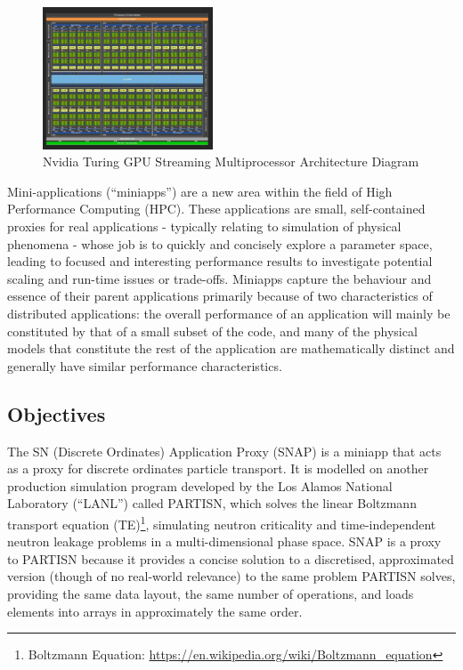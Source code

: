 \documentclass[conference]{IEEEtran}
\begin{document}
\begin{figure}
\centering
\includegraphics[width=0.45\textwidth]{images/gpu_diagram.jpg}
\caption{Nvidia Turing GPU Streaming Multiprocessor Architecture Diagram}
\label{fig:gpu_diagram}
\end{figure}

Mini-applications (``miniapps”) are a new area within the field of High Performance Computing (HPC). These applications are small, self-contained proxies for real applications - typically relating to simulation of physical phenomena - whose job is to quickly and concisely explore a parameter space, leading to focused and interesting performance results to investigate potential scaling and run-time issues or trade-offs\cite{miniapps}. Miniapps capture the behaviour and essence of their parent applications primarily because of two characteristics of distributed applications: the overall performance of an application will mainly be constituted by that of a small subset of the code, and many of the physical models that constitute the rest of the application are mathematically distinct and generally have similar performance characteristics\cite{miniapps}.

\subsection{Objectives}

The SN (Discrete Ordinates) Application Proxy (SNAP) is a miniapp that acts as a proxy for discrete ordinates particle transport. It is modelled on another production simulation program developed by the Los Alamos National Laboratory (``LANL'') called PARTISN, which solves the linear Boltzmann transport equation (TE)\footnote{Boltzmann Equation: \url{https://en.wikipedia.org/wiki/Boltzmann_equation}\raggedright}, simulating neutron criticality and time-independent neutron leakage problems\cite{partisn} in a multi-dimensional phase space. SNAP is a proxy to PARTISN because it provides a concise solution to a discretised, approximated version (though of no real-world relevance) to the same problem PARTISN solves, providing the same data layout, the same number of operations, and loads elements into arrays in approximately the same order.
\end{document}
